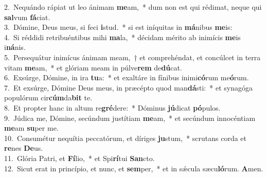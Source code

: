 {2.~}Nequándo rápiat ut leo ánimam \textbf{me}am,~* dum non est qui rédimat, neque qui \textbf{sal}vum \textbf{fá}ciat.\\
{3.~}Dómine, Deus meus, si feci \textbf{i}stud.~* si est iníquitas in \textbf{má}nibus \textbf{me}is:\\
{4.~}Si réddidi retribuéntibus mihi \textbf{ma}la,~* décidam mérito ab inimícis \textbf{me}is i\textbf{ná}nis.\\
{5.~}Persequátur inimícus ánimam meam,~† et comprehéndat, et concúlcet in terra vitam \textbf{me}am,~* et glóriam meam in púlve\textbf{rem} de\textbf{dú}cat.\\
{6.~}Exsúrge, Dómine, in ira \textbf{tu}a:~* et exaltáre in fínibus inimi\textbf{có}rum me\textbf{ó}rum.\\
{7.~}Et exsúrge, Dómine Deus meus, in præcépto quod man\textbf{dá}sti:~* et synagóga populórum cir\textbf{cúm}da\textbf{bit} te.\\
{8.~}Et propter hanc in altum re\textbf{gré}dere:~* Dóminus \textbf{jú}dicat \textbf{pó}pulos.\\
{9.~}Júdica me, Dómine, secúndum justítiam \textbf{me}am,~* et secúndum innocéntiam \textbf{me}am \textbf{su}per me.\\
{10.~}Consumétur nequítia peccatórum, et díriges \textbf{ju}stum,~* scrutans corda et \textbf{re}nes \textbf{De}us.\\
{11.~}Glória Patri, et \textbf{Fí}lio,~* et Spi\textbf{rí}tui \textbf{San}cto.\\
{12.~}Sicut erat in princípio, et nunc, et \textbf{sem}per,~* et in sǽcula sæcu\textbf{ló}rum. \textbf{A}men.\\
